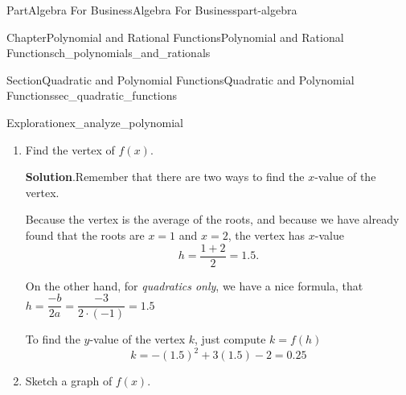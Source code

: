 \documentclass{tufte-book}
\newcommand{\blocktitlefont}{\relax}
\numberwithin{equation}{chapter}
\begin{document}
\begin{partptx}{Part}{Algebra For Business}{}{Algebra For Business}{}{}{part-algebra}
\begin{chapterptx}{Chapter}{Polynomial and Rational Functions}{}{Polynomial and Rational Functions}{}{}{ch_polynomials_and_rationals}
\begin{sectionptx}{Section}{Quadratic and Polynomial Functions}{}{Quadratic and Polynomial Functions}{}{}{sec_quadratic_functions}
\begin{exploration}{Exploration}{}{ex_analyze_polynomial}
\begin{enumerate}[font=\bfseries,label=(\alph*),ref=\alph*]
\begin{equation*}
(-1)\cdot \Big(\frac{-1}{-1}x^2 + \frac{3}{-1}x -\frac{2}{-1}\Big) = 0 
\end{equation*}
Essentially, we are "un-distributing" the leading term of \(-1\).  Simplifying the equation down, we now get%
\begin{equation*}
(-1)\cdot \Big(x^2 -3 x +2 \Big) = 0 
\end{equation*}
Now we can factor the quadratic inside.  We want to find some numbers \(d_1,d_2\) such that%
\begin{equation*}
x^2 - 3x + 2 = (x+d_1)(x+d_2) = x^2 + (d_1+d_2)x + d_1\cdot d_2\text{.}
\end{equation*}
In other words, we want numbers that add to \(-3\) and multiply to positive \(2\).  Trying \(d_1=-1\) and \(d_2=-2\), we get \(-1+-2=-3\) and \((-1)(-2)=2\) as desired.  That means we can rewrite our original equation as%
\begin{equation*}
(-1)\cdot \Big(x-1\Big)\Big(x-2\Big) = 0 
\end{equation*}
But the product of two numbers can only equal zero if the individual numbers are zero.  That means that the equation is equivalent to \emph{either} having \(x-1=0\) \emph{or} having \(x-2=0\).%
\par
In other words, this is equivalent to having \(x=1\) or \(x=2\), which are the two \(x\)-intercepts of our quadratic.%
\item{}Find the vertex of \(f(x)\).%
\par\smallskip%
\noindent\textbf{\blocktitlefont Solution}.\hypertarget{ex_analyze_polynomial-3-2}{}\quad{}Remember that there  are two ways to find the \(x\)-value of the vertex.%
\par
Because the vertex is the average of the roots, and because we have already found that the roots are \(x=1\) and \(x=2\), the vertex has \(x\)-value%
\begin{equation*}
h=\dfrac{1+2}{2} = 1.5\text{.}
\end{equation*}
%
\par
On the other hand, for \emph{quadratics only}, we have a nice formula, that \(h=\dfrac{-b}{2a} = \dfrac{-3}{2\cdot (-1)}= 1.5\)%
\par
To find the \(y\)-value of the vertex \(k\), just compute \(k = f(h) \)%
\begin{equation*}
k = -(1.5)^2 + 3(1.5) - 2 = 0.25
\end{equation*}
%
\item{}Sketch a graph of \(f(x)\).%

\end{enumerate}
\end{exploration}
\end{sectionptx}
\end{chapterptx}
\end{partptx}
\end{document}
